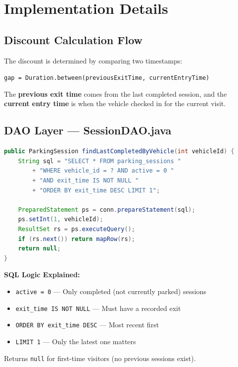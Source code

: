 \documentclass[12pt,a4paper]{article}
\begin{document}
\section{Implementation Details}

\subsection{Discount Calculation Flow}
The discount is determined by comparing two timestamps:
\begin{center}
\texttt{gap = Duration.between(previousExitTime, currentEntryTime)}
\end{center}
The \textbf{previous exit time} comes from the last completed session, and the \textbf{current entry time} is when the vehicle checked in for the current visit.

\subsection{DAO Layer — SessionDAO.java}

\begin{lstlisting}[language=Java, caption={Find Last Completed Session}]
public ParkingSession findLastCompletedByVehicle(int vehicleId) {
    String sql = "SELECT * FROM parking_sessions "
        + "WHERE vehicle_id = ? AND active = 0 "
        + "AND exit_time IS NOT NULL "
        + "ORDER BY exit_time DESC LIMIT 1";
    
    PreparedStatement ps = conn.prepareStatement(sql);
    ps.setInt(1, vehicleId);
    ResultSet rs = ps.executeQuery();
    if (rs.next()) return mapRow(rs);
    return null;
}
\end{lstlisting}

\textbf{SQL Logic Explained:}
\begin{itemize}[noitemsep]
    \item \texttt{active = 0} — Only completed (not currently parked) sessions
    \item \texttt{exit\_time IS NOT NULL} — Must have a recorded exit
    \item \texttt{ORDER BY exit\_time DESC} — Most recent first
    \item \texttt{LIMIT 1} — Only the latest one matters
\end{itemize}

Returns \texttt{null} for first-time visitors (no previous sessions exist).
\end{document}
